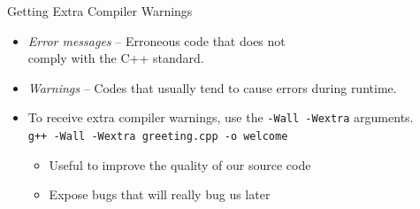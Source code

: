 \documentclass[14pt,aspectratio=1610]{beamer}
\begin{document}
\begin{frame}{Getting Extra Compiler Warnings}
\begin{itemize}
\item<+->
  \emph{Error messages} -- Erroneous code that does not \\ comply with the C++ standard.
\item<+->
\emph{Warnings} -- Codes that usually tend to cause errors during runtime.
\item<+->
  To receive extra compiler warnings, use the \lstinline[language={}, basicstyle=\ttfamily\color{codeVariable}]{-Wall -Wextra} arguments.\\
  \lstinline[language={}, basicstyle=\ttfamily\color{codeVariable}]{g++ -Wall -Wextra greeting.cpp -o welcome}
  \begin{itemize}
  \item
    Useful to improve the quality of our source code
  \item
    Expose bugs that will really bug us later
  \end{itemize}
\end{itemize}
\end{frame}
\end{document}
